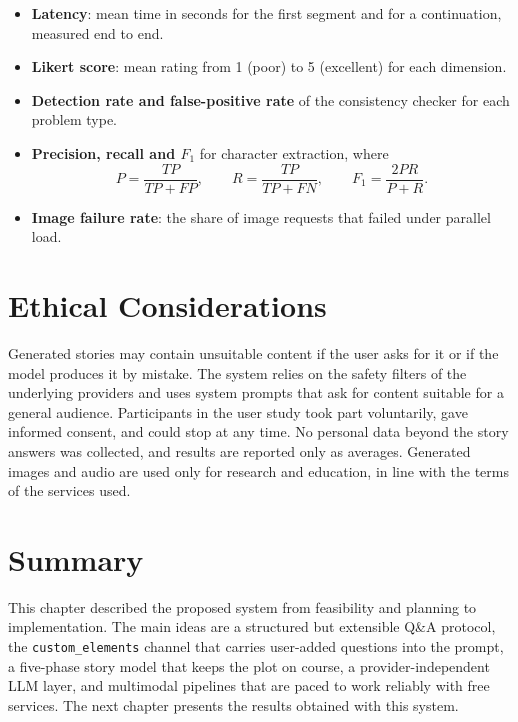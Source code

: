 \begin{itemize}
    \item \textbf{Latency}: mean time in seconds for the first segment and for a continuation, measured end to end.
    \item \textbf{Likert score}: mean rating from 1 (poor) to 5 (excellent) for each dimension.
    \item \textbf{Detection rate and false-positive rate} of the consistency checker for each problem type.
    \item \textbf{Precision, recall and $F_1$} for character extraction, where
    \begin{equation}
    P = \frac{TP}{TP+FP}, \qquad R = \frac{TP}{TP+FN}, \qquad F_1 = \frac{2PR}{P+R}.
    \end{equation}
    \item \textbf{Image failure rate}: the share of image requests that failed under parallel load.
\end{itemize}

\section{Ethical Considerations}

Generated stories may contain unsuitable content if the user asks for it or if the model produces it by mistake. The system relies on the safety filters of the underlying providers and uses system prompts that ask for content suitable for a general audience. Participants in the user study took part voluntarily, gave informed consent, and could stop at any time. No personal data beyond the story answers was collected, and results are reported only as averages. Generated images and audio are used only for research and education, in line with the terms of the services used.

\section{Summary}

This chapter described the proposed system from feasibility and planning to implementation. The main ideas are a structured but extensible Q\&A protocol, the \texttt{custom\_elements} channel that carries user-added questions into the prompt, a five-phase story model that keeps the plot on course, a provider-independent LLM layer, and multimodal pipelines that are paced to work reliably with free services. The next chapter presents the results obtained with this system.
